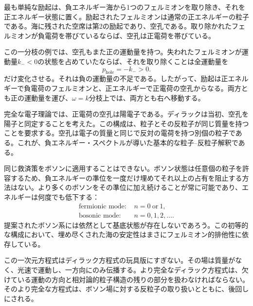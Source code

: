 最も単純な励起は、負エネルギー海から1つのフェルミオンを取り除き、それを正エネルギー状態に置く。励起されたフェルミオンは通常の正エネルギーの粒子である。海に残された空席は第2の励起であり、空孔である。取り除かれたフェルミオンが負電荷を帯びているならば、空孔は正電荷を帯びている。

この一分枝の例では、空孔もまた正の運動量を持つ。失われたフェルミオンが運動量\(k_-<0\)の状態を占めていたならば、それを取り除くことは全運動量を
\begin{equation}
p_{\mathrm{hole}}=-k_->0.
\end{equation}
だけ変化させる。それは負の運動量の不足である。したがって、励起は正エネルギーで負電荷のフェルミオンと、正エネルギーで正電荷の空孔からなる。両方とも正の運動量を運び、\(\omega=k\)分枝上では、両方とも右へ移動する。

完全な電子理論では、正電荷の空孔は陽電子である。ディラックは当初、空孔を陽子と同定することを考えた。この構成は、粒子とその反粒子が同じ質量を持つことを要求する。空孔は電子の質量と同じで反対の電荷を持つ別個の粒子である。これが、負エネルギー・スペクトルが導いた基本的な粒子--反粒子解釈である。

同じ救済策をボソンに適用することはできない。ボソン状態は任意個の粒子を許容するため、負エネルギーの準位を一度だけ埋めてそれ以上の占有を阻止する方法はない。より多くのボソンをその準位に加え続けることが常に可能であり、エネルギーは何度でも低下する：
\begin{equation}
\begin{aligned}
\text{fermionic mode: }&n=0\ \text{or}\ 1,\\
\text{bosonic mode: }&n=0,1,2,\ldots .
\end{aligned}
\end{equation}
提案されたボソン系には依然として基底状態が存在しないであろう。この初等的な構成において、埋め尽くされた海の安定性はまさにフェルミオン的排他性に依存している。

この一次元方程式はディラック方程式の玩具版にすぎない。その場は質量がなく、光速で運動し、一方向にのみ伝播する。より完全なディラック方程式は、欠けている運動の方向と相対論的粒子構造の残りの部分を扱わなければならない。そのより完全な方程式は、ボソン場に対する反粒子の取り扱いとともに、後回しにされる。